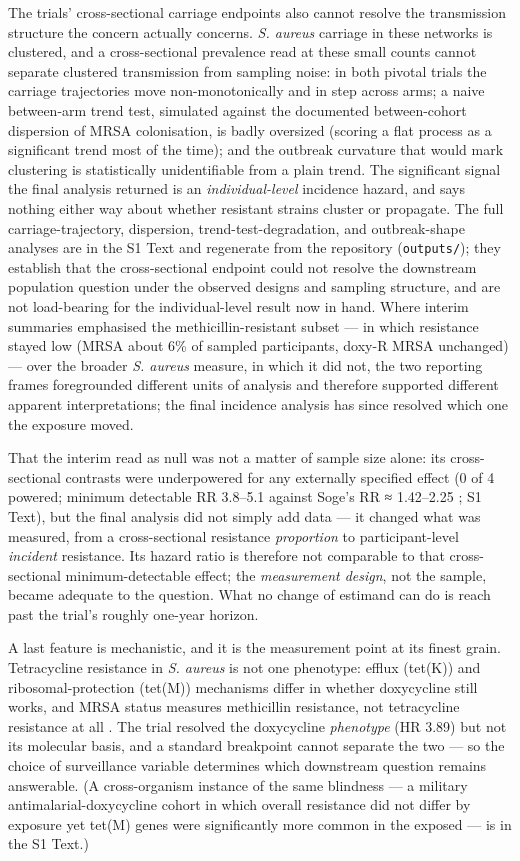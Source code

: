 \documentclass[10pt,letterpaper]{article}
\begin{document}
The trials' cross-sectional carriage endpoints also cannot resolve the
transmission structure the concern actually concerns. \emph{S. aureus}
carriage in these networks is clustered, and a cross-sectional
prevalence read at these small counts cannot separate clustered
transmission from sampling noise: in both pivotal trials the carriage
trajectories move non-monotonically and in step across arms; a naive
between-arm trend test, simulated against the documented between-cohort
dispersion of MRSA colonisation, is badly oversized (scoring a flat
process as a significant trend most of the time); and the outbreak
curvature that would mark clustering is statistically unidentifiable
from a plain trend. The significant signal the final analysis returned
is an \emph{individual-level} incidence hazard, and says nothing either
way about whether resistant strains cluster or propagate. The full
carriage-trajectory, dispersion, trend-test-degradation, and
outbreak-shape analyses are in the S1 Text and regenerate
from the repository (\texttt{outputs/}); they establish that the cross-sectional endpoint could not resolve the downstream population question under the observed designs and sampling structure, and are not load-bearing for the individual-level
result now in hand. Where interim summaries emphasised the
methicillin-resistant subset --- in which resistance stayed low (MRSA
about 6\% of sampled participants, doxy-R MRSA unchanged) --- over the
broader \emph{S. aureus} measure, in which it did not, the two reporting
frames foregrounded different units of analysis and therefore supported
different apparent interpretations; the final incidence analysis has
since resolved which one the exposure moved.

That the interim read as null was not a matter of sample size alone:
its cross-sectional contrasts were underpowered for any externally
specified effect (0 of 4 powered; minimum detectable RR 3.8--5.1 against
Soge's RR ≈ 1.42--2.25 \cite{soge2025}; S1 Text), but
the final analysis did not simply add data --- it changed what was
measured, from a cross-sectional resistance \emph{proportion} to
participant-level \emph{incident} resistance. Its hazard ratio is
therefore not comparable to that cross-sectional minimum-detectable
effect; the \emph{measurement design}, not the sample, became adequate
to the question. What no change of estimand can do is reach past the
trial's roughly one-year horizon.

A last feature is mechanistic, and it is the measurement point at its
finest grain. Tetracycline resistance in \emph{S. aureus} is not one
phenotype: efflux (tet(K)) and ribosomal-protection (tet(M)) mechanisms
differ in whether doxycycline still works, and MRSA status measures
methicillin resistance, not tetracycline resistance at all
\cite{liu2011, grossman2016}. The trial resolved the doxycycline
\emph{phenotype} (HR 3.89) but not its molecular basis, and a standard
breakpoint cannot separate the two --- so the choice of surveillance
variable determines which downstream question remains answerable. (A
cross-organism instance of the same blindness --- a military
antimalarial-doxycycline cohort in which overall resistance did not
differ by exposure yet tet(M) genes were significantly more common in
the exposed --- is in the S1 Text.)
\end{document}
